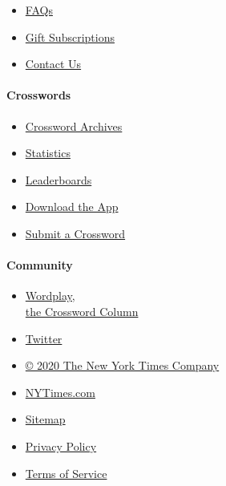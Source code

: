 \begin{itemize}
\tightlist
\item
  \href{https://help.nytimes.com/hc/en-us/articles/115014755667-New-York-Times-Crossword}{FAQs}
\item
  \href{https://nytimes.com/subscription/crosswords/gift}{Gift
  Subscriptions}
\item
  \href{mailto:NYTCrossword@nytimes.com}{Contact Us}
\end{itemize}

\hypertarget{crosswords}{%
\paragraph{Crosswords}\label{crosswords}}

\begin{itemize}
\tightlist
\item
  \href{/crosswords/archive}{Crossword Archives}
\item
  \href{/puzzles/stats}{Statistics}
\item
  \href{/puzzles/leaderboards}{Leaderboards}
\item
  \href{/crosswords/apps}{Download the App}
\item
  \href{/puzzles/submissions/crossword}{Submit a Crossword}
\end{itemize}

\hypertarget{community}{%
\paragraph{Community}\label{community}}

\begin{itemize}
\tightlist
\item
  \href{https://nytimes.com/column/wordplay}{Wordplay,\\
  the Crossword Column}
\item
  \href{https://twitter.com/NYTimesWordplay}{Twitter}
\end{itemize}

\begin{itemize}
\tightlist
\item
  \href{https://www.nytco.com/}{© 2020 The New York Times Company}
\item
  \href{https://nytimes.com}{NYTimes.com}
\item
  \href{https://spiderbites.nytimes.com/}{Sitemap}
\item
  \href{https://nytimes.com/subscription/privacy-policy\#/privacy}{Privacy
  Policy}
\item
  \href{https://help.nytimes.com/hc/en-us/articles/115014893428-Terms-of-service}{Terms
  of Service}
\end{itemize}

